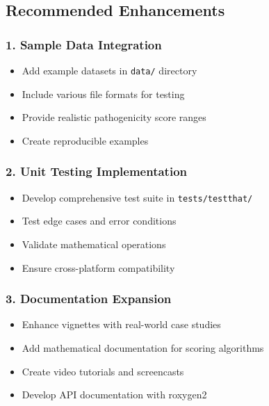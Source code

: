 \documentclass[
  11pt,
]{article}
\providecommand{\tightlist}{%
  \setlength{\itemsep}{0pt}\setlength{\parskip}{0pt}}
\begin{document}
\subsection{Recommended Enhancements}\label{recommended-enhancements}

\subsubsection{1. Sample Data
Integration}\label{sample-data-integration}

\begin{itemize}
\tightlist
\item
  Add example datasets in \texttt{data/} directory
\item
  Include various file formats for testing
\item
  Provide realistic pathogenicity score ranges
\item
  Create reproducible examples
\end{itemize}

\subsubsection{2. Unit Testing
Implementation}\label{unit-testing-implementation}

\begin{itemize}
\tightlist
\item
  Develop comprehensive test suite in \texttt{tests/testthat/}
\item
  Test edge cases and error conditions
\item
  Validate mathematical operations
\item
  Ensure cross-platform compatibility
\end{itemize}

\subsubsection{3. Documentation
Expansion}\label{documentation-expansion}

\begin{itemize}
\tightlist
\item
  Enhance vignettes with real-world case studies
\item
  Add mathematical documentation for scoring algorithms
\item
  Create video tutorials and screencasts
\item
  Develop API documentation with roxygen2
\end{itemize}
\end{document}
